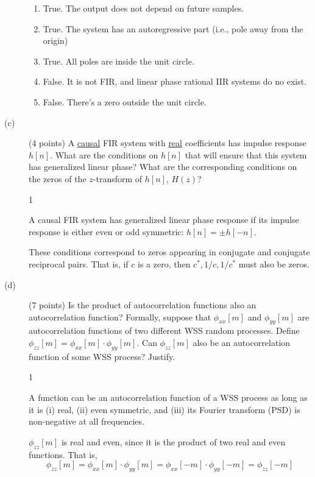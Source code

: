 \documentclass[10pt]{article}
\def\SOLUTIONS{0} %
\def\SolutionsColor{red2}
\begin{document}
\begin{description}
{\begin{enumerate}
  \item True. The output does not depend on future samples.
  \item True. The system has an autoregressive part (i.e., pole away from the origin)
  \item True. All poles are inside the unit circle.
  \item False. It is not FIR, and linear phase rational IIR systems do no exist.
  \item False. There's a zero outside the unit circle.
\end{enumerate}
}
\else\vspace{3.5cm}
\fi

%
\item[(c)] (4 points) A \underline{causal} FIR system with \underline{real} coefficients has impulse response $h[n]$. What are the conditions on $h[n]$ that will ensure that this system has generalized linear phase? What are the corresponding conditions on the zeros of the $z$-transform of $h[n]$, $H(z)$?

\if\SOLUTIONS1
{\color{\SolutionsColor} 
A causal FIR system has generalized linear phase response if its impulse response is either even or odd symmetric: $h[n] = \pm h[-n]$.

These conditions correspond to zeros appearing in conjugate and conjugate reciprocal pairs. That is, if $c$ is a zero, then $c^*, 1/c, 1/c^*$ must also be zeros.

}
\else\vspace{5cm}
\fi

%
\item[(d)] (7 points) Is the product of autocorrelation functions also an autocorrelation function? Formally, suppose that $\phi_{xx}[m]$ and $\phi_{yy}[m]$ are autocorrelation functions of two different WSS random processes. Define $\phi_{zz}[m] = \phi_{xx}[m]\cdot \phi_{yy}[m]$. Can $\phi_{zz}[m]$ also be an autocorrelation function of some WSS process? Justify.

\if\SOLUTIONS1
{\color{\SolutionsColor}
A function can be an autocorrelation function of a WSS process as long as it is (i) real, (ii) even symmetric, and (iii) its Fourier transform (PSD) is non-negative at all frequencies. 

$\phi_{zz}[m]$ is real and even, since it is the product of two real and even functions. That is, 
\begin{equation*}
\phi_{zz}[m] = \phi_{xx}[m]\cdot \phi_{yy}[m] = \phi_{xx}[-m]\cdot \phi_{yy}[-m] = \phi_{zz}[-m]
\end{equation*}

}
\end{description}
\end{document}
